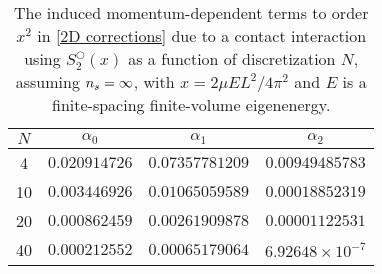 \begin{table}
    \caption{The induced momentum-dependent terms to order $x^2$ in \eqref{2D corrections} due to a contact interaction using $S^\bigcirc_2(x)$ as a function of discretization $N$, assuming ${n_s}=\infty$, with $x=2\mu E L^2/4\pi^2$ and $E$ is a finite-spacing finite-volume eigenenergy.
    }
    \label{tab:induced terms in 2 d}
    \begin{tabular}{c|ccc}
    $N$ &   $\alpha_0$      &   $\alpha_1$      & $\alpha_2$                \\
    \hline
    4   &   $0.020914726$   &   $0.07357781209$ & $0.00949485783$           \\
    10  &   $0.003446926$   &   $0.01065059589$ & $0.00018852319$           \\
    20  &   $0.000862459$   &   $0.00261909878$ & $0.00001122531$           \\
    40  &   $0.000212552$   &   $0.00065179064$ & $6.92648\times10^{-7}$    \\
\end{tabular}
\end{table}
